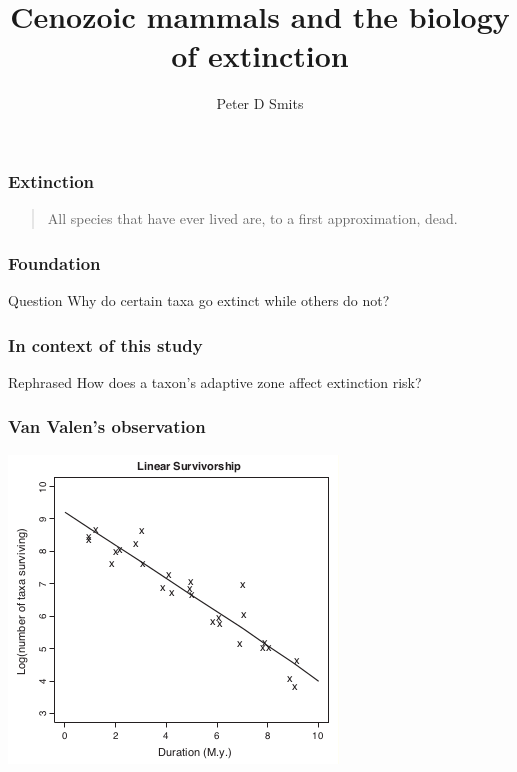 \documentclass{beamer}
\title{Cenozoic mammals and the biology of extinction}
\author{Peter D Smits}
\institute{Committee on Evolutionary Biology, University of Chicago}
\begin{document}
\begin{frame}
  \maketitle
\end{frame}

\begin{frame}
  \frametitle{Extinction}
  \begin{quotation}
    All species that have ever lived are, to a first approximation, dead.

    \tiny{}
  \end{quotation}
\end{frame}

\begin{frame}
  \frametitle{Foundation}
  \begin{alertblock}{Question}
    Why do certain taxa go extinct while others do not?
  \end{alertblock}
\end{frame}

\begin{frame}
  \frametitle{In context of this study}
  \begin{block}{Rephrased}
    How does a taxon's \alert{adaptive zone} affect \alert{extinction risk?}
  \end{block}
\end{frame}

\begin{frame}
  \frametitle{Van Valen's observation}

  \begin{center}
    \includegraphics[height = 0.7\textheight, keepaspectratio = true]{figure/liow}

    \tiny{}
  \end{center}
\end{frame}
\end{document}
